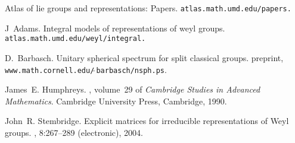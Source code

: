 Atlas of lie groups and representations: Papers.
\newblock \tt atlas.math.umd.edu/papers.

J~Adams.
\newblock Integral models of representations of weyl groups.
\newblock \tt atlas.math.umd.edu/weyl/integral.

D.~Barbasch.
\newblock Unitary spherical spectrum for split classical groups.
\newblock preprint, {\tt www.math.cornell.edu/$\tilde{\ }$barbasch/nsph.ps}.

James~E. Humphreys.
, volume~29 of {\em
  Cambridge Studies in Advanced Mathematics}.
\newblock Cambridge University Press, Cambridge, 1990.

John~R. Stembridge.
\newblock Explicit matrices for irreducible representations of {W}eyl groups.
, 8:267--289 (electronic), 2004.
